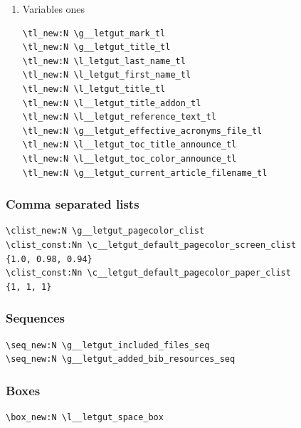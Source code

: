 \documentclass{letgut}
\begin{document}
\begin{enumerate}
\begin{lstlisting}
  Ne~ pas~ omettre~ l'éditorial~ !\\(à~ faire~ figurer~
  dans~ un~ \file*{\c__letgut_editorial_file_tl.tex}~
  dans~ le~ dossier~ courant)
}
\tl_const:Nn \c__letgut_missing_infomations_tl {
  Ne~ pas~ omettre~ les~ informations~ sur~
  \c__letgut_gutenberg_tl{}~ !\\(dans~ un~
  \file*{\c__letgut_informations_gutenberg_file_tl.tex}~
  situé~ soit~ dans~ le~ dossier~ courant, soit~ dans~ le~
  dossier~ parent)
}
\tl_const:Nn \c__letgut_default_alert_box_color_tl {
  gray9
}
\tl_const:Nn \c__letgut_default_allcolors_links_color_tl
{
  teal!60!black
}
\tl_const:Nn \c__letgut_attachment_icon_tl
{
  \color{black}\tiAttachmentOutline
}
\end{lstlisting}
\item Variables ones
\label{ImplementationDeclarationsTokenlistsVariablesones-pxcg55h0jlj0}
\begin{lstlisting}
\tl_new:N \g__letgut_mark_tl
\tl_new:N \g__letgut_title_tl
\tl_new:N \l_letgut_last_name_tl
\tl_new:N \l_letgut_first_name_tl
\tl_new:N \l_letgut_title_tl
\tl_new:N \l__letgut_title_addon_tl
\tl_new:N \l__letgut_reference_text_tl
\tl_new:N \g__letgut_effective_acronyms_file_tl
\tl_new:N \l__letgut_toc_title_announce_tl
\tl_new:N \l__letgut_toc_color_announce_tl
\tl_new:N \g__letgut_current_article_filename_tl
\end{lstlisting}
\end{enumerate}
\subsubsection{Comma separated lists}
\label{ImplementationDeclarationsCommaseparatedlists-vhdg55h0jlj0}
\begin{lstlisting}
\clist_new:N \g__letgut_pagecolor_clist
\clist_const:Nn \c__letgut_default_pagecolor_screen_clist
{1.0, 0.98, 0.94}
\clist_const:Nn \c__letgut_default_pagecolor_paper_clist
{1, 1, 1}
\end{lstlisting}
\subsubsection{Sequences}
\label{ImplementationDeclarationsSequences-m2eg55h0jlj0}
\begin{lstlisting}
\seq_new:N \g__letgut_included_files_seq
\seq_new:N \g__letgut_added_bib_resources_seq
\end{lstlisting}
\subsubsection{Boxes}
\label{ImplementationDeclarationsBoxes-os5bm7d1hqk0}
\begin{lstlisting}
\box_new:N \l__letgut_space_box
\end{lstlisting}
\end{document}
